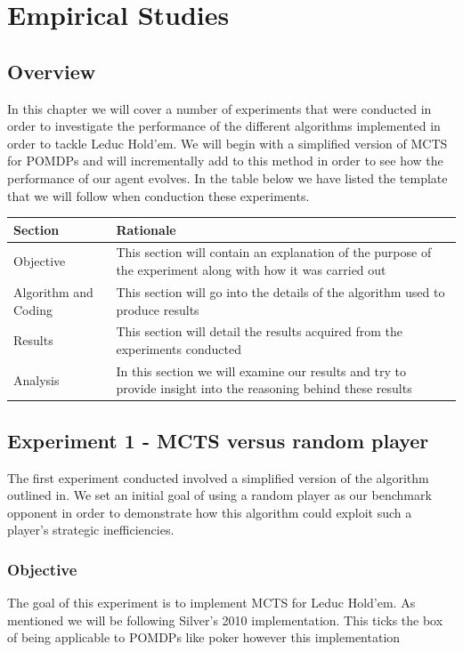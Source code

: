 
\chapter{Empirical Studies}\label{ch:empirical}

\section{Overview}\label{sec:empOverview}
In this chapter we will cover a number of experiments that were conducted in order to investigate
the performance of the different algorithms implemented in order to tackle Leduc Hold'em.
We will begin with a simplified version of MCTS for POMDPs and will incrementally add to this
method in order to see how the performance of our agent evolves.
In the table below we have listed the template that we will follow when conduction these experiments.

\begin{tabular}{ | p{2cm} | p{10cm} | }
    \hline
    \textbf{Section} & \textbf{Rationale} \\
    \hline
    Objective & This section will contain an explanation of the purpose of the experiment along with
    how it was carried out \\
    \hline
    Algorithm and Coding & This section will go into the details of the algorithm used to produce results \\
    \hline
    Results & This section will detail the results acquired from the experiments conducted \\
    \hline
    Analysis & In this section we will examine our results and try to provide insight into the
    reasoning behind these results \\
    \hline
\end{tabular}

\section{Experiment 1 - MCTS versus random player}\label{sec:expmeriment1}
The first experiment conducted involved a simplified version of the algorithm outlined in\citep{silver2010monte}.
We set an initial goal of using a random player as our benchmark opponent in order to demonstrate how
this algorithm could exploit such a player's strategic inefficiencies.

\subsection{Objective}\label{subsec:objective1}
The goal of this experiment is to implement MCTS for Leduc Hold'em.
As mentioned we will be following Silver's 2010 implementation.
This ticks the box of being applicable to POMDPs like poker however this implementation
